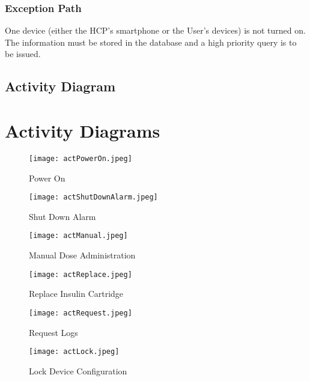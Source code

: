 \documentclass{scrreprt}
\begin{document}
    \subsubsection{Exception Path}
        One device (either the HCP's smartphone or the User's devices) is not turned on. The information must be stored in the database and a high priority query is to be issued.
\subsection{Activity Diagram}

\section{Activity Diagrams}


\begin{figure}[h!]
    \centering
    \texttt{[image: actPowerOn.jpeg]}
    \caption{Power On}
    \label{fig:poweron}
\end{figure}

\begin{figure}[h!]
    \centering
    \texttt{[image: actShutDownAlarm.jpeg]}
    \caption{Shut Down Alarm}
    \label{fig:shutdown}
\end{figure}

\begin{figure}[h!]
    \centering
    \texttt{[image: actManual.jpeg]}
    \caption{Manual Dose Administration}
    \label{fig:manual}
\end{figure}

\begin{figure}[h!]
    \centering
    \texttt{[image: actReplace.jpeg]}
    \caption{Replace Insulin Cartridge}
    \label{fig:replace}
\end{figure}

\begin{figure}[h!]
    \centering
    \texttt{[image: actRequest.jpeg]}
    \caption{Request Logs}
    \label{fig:request}
\end{figure}

\begin{figure}[h!]
    \centering
    \texttt{[image: actLock.jpeg]}
    \caption{Lock Device Configuration}
    \label{fig:lock}
\end{figure}
\end{document}
